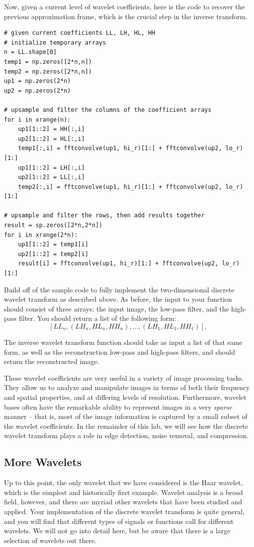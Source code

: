 Now, given a current level of wavelet coefficients, here is the code to recover the previous
approximation frame, which is the crucial step in the inverse transform.
\begin{lstlisting}
# given current coefficients LL, LH, HL, HH
# initialize temporary arrays
n = LL.shape[0]
temp1 = np.zeros([2*n,n])
temp2 = np.zeros([2*n,n])
up1 = np.zeros(2*n)
up2 = np.zeros(2*n)

# upsample and filter the columns of the coefficient arrays
for i in xrange(n):
	up1[1::2] = HH[:,i]
	up2[1::2] = HL[:,i]
	temp1[:,i] = fftconvolve(up1, hi_r)[1:] + fftconvolve(up2, lo_r)[1:]
	up1[1::2] = LH[:,i]
	up2[1::2] = LL[:,i]		
	temp2[:,i] = fftconvolve(up1, hi_r)[1:] + fftconvolve(up2, lo_r)[1:]

# upsample and filter the rows, then add results together
result = sp.zeros([2*n,2*n])
for i in xrange(2*n):
	up1[1::2] = temp1[i]
	up2[1::2] = temp2[i]
	result[i] = fftconvolve(up1, hi_r)[1:] + fftconvolve(up2, lo_r)[1:]
\end{lstlisting}

\begin{problem}
Build off of the sample code to fully implement the two-dimensional discrete
wavelet transform as described above.
As before, the input to your function should consist of
three arrays: the input image, the low-pass filter, and the high-pass filter.
You should return a list of the following form: $$[LL_n,(LH_n,HL_n,HH_n), \ldots
,(LH_1,HL_1,HH_1)].$$

The inverse wavelet transform function should take as input a list
of that same form, as well as the reconstruction low-pass and high-pass filters,
and should return the reconstructed image.
\end{problem}

These wavelet coefficients are very useful in a variety of image processing
tasks. They allow us to analyze and manipulate images in terms of both their
frequency and spatial properties, and at differing levels of resolution.
Furthermore, wavelet bases often have the remarkable ability to represent
images in a very \textit{sparse} manner -- that is, most of the image
information is captured by a small subset of the wavelet coefficients.
In the remainder of this lab, we will see how the discrete wavelet transform
plays a role in edge detection, noise removal, and compression.

\subsection*{More Wavelets}
Up to this point, the only wavelet that we have considered is the Haar wavelet,
which is the simplest and historically first example. Wavelet analysis is a broad
field, however, and there are myriad other wavelets that have been studied and
applied. Your implementation of the discrete wavelet transform is quite general,
and you will find that different types of signals or functions call for different
wavelets. We will not go into detail here, but be aware that there is a large
selection of wavelets out there.

